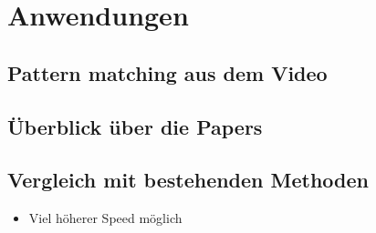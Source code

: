 %
%
%
%
\section{Anwendungen 
\label{opt:section:anwendungen}}

\subsection{Pattern matching aus dem Video}
\subsection{Überblick über die Papers}
\subsection{Vergleich mit bestehenden Methoden}
\begin{itemize}
    \item Viel höherer Speed möglich
\end{itemize}

\cite{opt:GuilletdeChatellus.2016}
\cite{opt:Lin.2018}
\cite{opt:ScienceDaily:AllOpticalNeuralNetwork}
\cite{opt:Tyson.2014}
